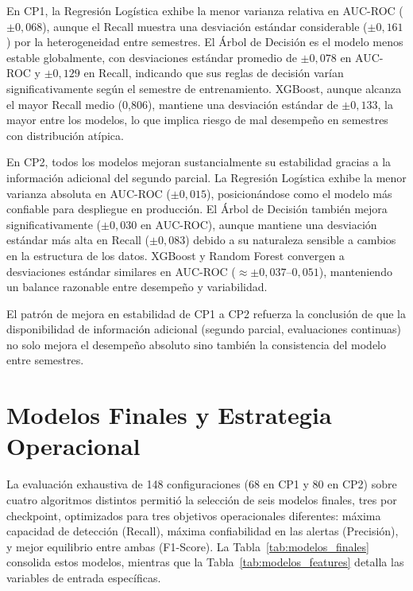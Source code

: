 \documentclass[12pt, letterpaper, openany]{report}
\begin{document}
En CP1, la Regresión Logística exhibe la menor varianza relativa en AUC-ROC ($\pm 0{,}068$), aunque el Recall muestra una desviación estándar considerable ($\pm 0{,}161$) por la heterogeneidad entre semestres. El Árbol de Decisión es el modelo menos estable globalmente, con desviaciones estándar promedio de $\pm 0{,}078$ en AUC-ROC y $\pm 0{,}129$ en Recall, indicando que sus reglas de decisión varían significativamente según el semestre de entrenamiento. XGBoost, aunque alcanza el mayor Recall medio (0,806), mantiene una desviación estándar de $\pm 0{,}133$, la mayor entre los modelos, lo que implica riesgo de mal desempeño en semestres con distribución atípica.

En CP2, todos los modelos mejoran sustancialmente su estabilidad gracias a la información adicional del segundo parcial. La Regresión Logística exhibe la menor varianza absoluta en AUC-ROC ($\pm 0{,}015$), posicionándose como el modelo más confiable para despliegue en producción. El Árbol de Decisión también mejora significativamente ($\pm 0{,}030$ en AUC-ROC), aunque mantiene una desviación estándar más alta en Recall ($\pm 0{,}083$) debido a su naturaleza sensible a cambios en la estructura de los datos. XGBoost y Random Forest convergen a desviaciones estándar similares en AUC-ROC ($\approx \pm 0{,}037$--$0{,}051$), manteniendo un balance razonable entre desempeño y variabilidad.

El patrón de mejora en estabilidad de CP1 a CP2 refuerza la conclusión de que la disponibilidad de información adicional (segundo parcial, evaluaciones continuas) no solo mejora el desempeño absoluto sino también la consistencia del modelo entre semestres.

\FloatBarrier

\section{Modelos Finales y Estrategia Operacional}

La evaluación exhaustiva de 148 configuraciones (68 en CP1 y 80 en CP2) sobre cuatro algoritmos distintos permitió la selección de seis modelos finales, tres por checkpoint, optimizados para tres objetivos operacionales diferentes: máxima capacidad de detección (Recall), máxima confiabilidad en las alertas (Precisión), y mejor equilibrio entre ambas (F1-Score). La Tabla~\ref{tab:modelos_finales} consolida estos modelos, mientras que la Tabla~\ref{tab:modelos_features} detalla las variables de entrada específicas.
\end{document}
